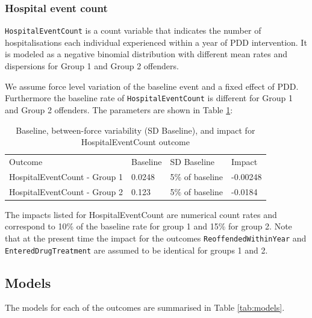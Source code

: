 \documentclass[
]{article}
\begin{document}
\hypertarget{hospital-event-count}{%
\subsubsection{Hospital event count}\label{hospital-event-count}}

\texttt{HospitalEventCount} is a count variable that indicates the number of hospitalisations each individual experienced within a year of PDD intervention. It is modeled as a negative binomial distribution with different mean rates and dispersions for Group 1 and Group 2 offenders.

We assume force level variation of the baseline event and a fixed effect of PDD. Furthermore the baseline rate of \texttt{HospitalEventCount} is different for Group 1 and Group 2 offenders. The parameters are shown in Table \ref{tab:hospEventCount}:

\begin{table}[H]

\caption{\label{tab:hospEventCount}Baseline, between-force variability (SD Baseline), and impact for HospitalEventCount outcome}
\centering
\begin{tabular}[t]{llll}
\toprule
\multicolumn{1}{l}{Outcome} & \multicolumn{1}{l}{Baseline} & \multicolumn{1}{l}{SD Baseline} & \multicolumn{1}{l}{Impact} \\
\cmidrule(l{3pt}r{3pt}){1-1} \cmidrule(l{3pt}r{3pt}){2-2} \cmidrule(l{3pt}r{3pt}){3-3} \cmidrule(l{3pt}r{3pt}){4-4}
HospitalEventCount - Group 1 & 0.0248 & 5\% of baseline & -0.00248\\
HospitalEventCount - Group 2 & 0.123 & 5\% of baseline & -0.0184\\
\bottomrule
\end{tabular}
\end{table}

The impacts listed for HospitalEventCount are numerical count rates and correspond to 10\% of the baseline rate for group 1 and 15\% for group 2. Note that at the present time the impact for the outcomes \texttt{ReoffendedWithinYear} and \texttt{EnteredDrugTreatment} are assumed to be identical for groups 1 and 2.

\hypertarget{models}{%
\subsection{Models}\label{models}}

The models for each of the outcomes are summarised in Table \ref{tab:models}.
\end{document}
